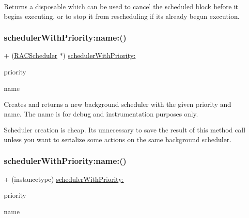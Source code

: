 Returns a disposable which can be used to cancel the scheduled block before it begins executing, or to stop it from rescheduling if it\textquotesingle{}s already begun execution. \mbox{\label{interface_r_a_c_scheduler_a28259d5d6caccd1c459f85154d9aca9a}} 
\subsubsection{\texorpdfstring{scheduler\+With\+Priority\+:name\+:()}{schedulerWithPriority:name:()}\hspace{0.1cm}{\footnotesize\ttfamily [1/3]}}
{\footnotesize\ttfamily + (\mbox{\hyperlink{interface_r_a_c_scheduler}{R\+A\+C\+Scheduler}} $\ast$) \mbox{\hyperlink{interface_r_a_c_scheduler_aa10e4f49fd6084c122ebd21e16e3de29}{scheduler\+With\+Priority\+:}} \begin{DoxyParamCaption}\item[{(R\+A\+C\+Scheduler\+Priority)}]{priority }\item[{name:(N\+S\+String $\ast$)}]{name }\end{DoxyParamCaption}}

Creates and returns a new background scheduler with the given priority and name. The name is for debug and instrumentation purposes only.

Scheduler creation is cheap. It\textquotesingle{}s unnecessary to save the result of this method call unless you want to serialize some actions on the same background scheduler. \mbox{\label{interface_r_a_c_scheduler_a34b1d3a261fb95c3a52347f7204422d7}} 
\subsubsection{\texorpdfstring{scheduler\+With\+Priority\+:name\+:()}{schedulerWithPriority:name:()}\hspace{0.1cm}{\footnotesize\ttfamily [2/3]}}
{\footnotesize\ttfamily + (instancetype) \mbox{\hyperlink{interface_r_a_c_scheduler_aa10e4f49fd6084c122ebd21e16e3de29}{scheduler\+With\+Priority\+:}} \begin{DoxyParamCaption}\item[{(R\+A\+C\+Scheduler\+Priority)}]{priority }\item[{name:(N\+S\+String $\ast$)}]{name }\end{DoxyParamCaption}}

